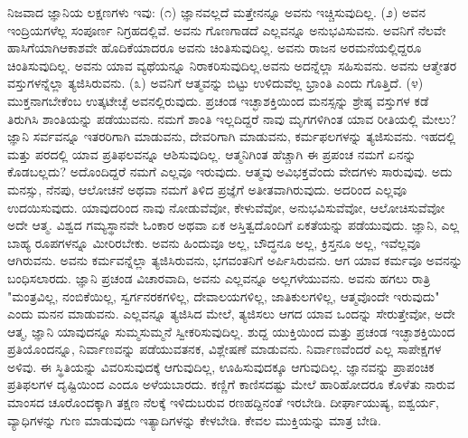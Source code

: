 ನಿಜವಾದ ಜ್ಞಾನಿಯ ಲಕ್ಷಣಗಳು ಇವು: (೧) ಜ್ಞಾನವಲ್ಲದೆ ಮತ್ತೇನನ್ನೂ ಅವನು ಇಚ್ಚಿಸುವುದಿಲ್ಲ. (೨) ಅವನ ಇಂದ್ರಿಯಗಳೆಲ್ಲ ಸಂಪೂರ್ಣ ನಿಗ್ರಹದಲ್ಲಿವೆ. ಅವನು ಗೊಣಗಾಡದೆ ಎಲ್ಲವನ್ನೂ ಅನುಭವಿಸುವನು. ಅವನಿಗೆ ನೆಲವೇ ಹಾಸಿಗೆಯಾಗಿ\break ಆಕಾಶವೇ ಹೊದಿಕೆಯಾದರೂ ಅವನು ಚಿಂತಿಸುವುದಿಲ್ಲ. ಅವನು ರಾಜನ ಅರಮನೆಯಲ್ಲಿದ್ದರೂ ಚಿಂತಿಸುವುದಿಲ್ಲ. ಅವನು ಯಾವ ವ್ಯಥೆಯನ್ನೂ ನಿರಾಕರಿಸುವುದಿಲ್ಲ.\break ಅವನು ಅದನ್ನೆಲ್ಲಾ ಸಹಿಸುವನು. ಅವನು ಆತ್ಮೇತರ ವಸ್ತುಗಳನ್ನೆಲ್ಲಾ ತ್ಯಜಿಸಿರುವನು. (೩) ಅವನಿಗೆ ಆತ್ಮವನ್ನು ಬಿಟ್ಟು ಉಳಿದುವೆಲ್ಲ ಭ್ರಾಂತಿ ಎಂದು ಗೊತ್ತಿದೆ. (೪) ಮುಕ್ತನಾಗಬೇಕೆಂಬ ಉತ್ಕಟೇಚ್ಛೆ ಅವನಲ್ಲಿರುವುದು. ಪ್ರಚಂಡ ಇಚ್ಛಾಶಕ್ತಿಯಿಂದ ಮನಸ್ಸನ್ನು ಶ್ರೇಷ್ಠ ವಸ್ತುಗಳ ಕಡೆ ತಿರುಗಿಸಿ ಶಾಂತಿಯನ್ನು ಪಡೆಯುವನು. ನಮಗೆ ಶಾಂತಿ ಇಲ್ಲದಿದ್ದರೆ ನಾವು ಮೃಗಗಳಿಗಿಂತ ಯಾವ ರೀತಿಯಲ್ಲಿ ಮೇಲು? ಜ್ಞಾನಿ ಸರ್ವವನ್ನೂ ಇತರರಿಗಾಗಿ ಮಾಡುವನು, ದೇವರಿಗಾಗಿ ಮಾಡುವನು, ಕರ್ಮಫಲಗಳನ್ನು ತ್ಯಜಿಸುವನು. ಇಹದಲ್ಲಿ ಮತ್ತು ಪರದಲ್ಲಿ ಯಾವ ಪ್ರತಿಫಲವನ್ನೂ ಆಶಿಸುವುದಿಲ್ಲ. ಆತ್ಮನಿಗಿಂತ ಹೆಚ್ಚಾಗಿ ಈ ಪ್ರಪಂಚ ನಮಗೆ ಏನನ್ನು ಕೊಡಬಲ್ಲದು? ಅದೊಂದಿದ್ದರೆ ನಮಗೆ ಎಲ್ಲವೂ ಇರುವುದು. ಆತ್ಮವು ಅವಿಭಕ್ತವೆಂದು ವೇದಗಳು ಸಾರುವುವು. ಅದು ಮನಸ್ಸು, ನೆನಪು, ಆಲೋಚನೆ ಅಥವಾ ನಮಗೆ ತಿಳಿದ ಪ್ರಜ್ಞೆಗೆ ಅತೀತವಾಗಿರುವುದು. ಅದರಿಂದ ಎಲ್ಲವೂ ಉದಯಿಸುವುದು. ಯಾವುದರಿಂದ ನಾವು ನೋಡುವೆವೋ, ಕೇಳುವೆವೋ, ಅನುಭವಿಸುವೆವೋ, ಆಲೋಚಿಸುವೆವೋ ಅದೇ ಆತ್ಮ. ವಿಶ್ವದ ಗಮ್ಯಸ್ಥಾನವೇ ಓಂಕಾರ ಅಥವಾ ಏಕ ಅಸ್ತಿತ್ವದೊಂದಿಗೆ ಏಕತೆಯನ್ನು ಪಡೆಯುವುದು. ಜ್ಞಾನಿ, ಎಲ್ಲ ಬಾಹ್ಯ ರೂಪಗಳನ್ನೂ ಮೀರಿರಬೇಕು. ಅವನು ಹಿಂದುವೂ ಅಲ್ಲ, ಬೌದ್ಧನೂ ಅಲ್ಲ, ಕ್ರಿಸ್ತನೂ ಅಲ್ಲ, ಇವೆಲ್ಲವೂ ಆಗಿರುವನು. ಅವನು ಕರ್ಮವನ್ನೆಲ್ಲಾ ತ್ಯಜಿಸಿರುವನು, ಭಗವಂತನಿಗೆ ಅರ್ಪಿಸಿರುವನು. ಆಗ ಯಾವ ಕರ್ಮವೂ ಅವನನ್ನು ಬಂಧಿಸಲಾರದು. ಜ್ಞಾನಿ ಪ್ರಚಂಡ ವಿಚಾರವಾದಿ, ಅವನು ಎಲ್ಲವನ್ನೂ ಅಲ್ಲಗಳೆಯುವನು. ಅವನು ಹಗಲು ರಾತ್ರಿ "ಮಂತ್ರವಿಲ್ಲ, ನಂಬಿಕೆಯಿಲ್ಲ, ಸ್ವರ್ಗನರಕಗಳಿಲ್ಲ, ದೇವಾಲಯಗಳಿಲ್ಲ, ಜಾತಿಕುಲಗಳಿಲ್ಲ, ಆತ್ಮವೊಂದೇ ಇರುವುದು" ಎಂದು ಮನನ ಮಾಡುವನು. ಎಲ್ಲವನ್ನೂ ತ್ಯಜಿಸಿದ ಮೇಲೆ, ತ್ಯಜಿಸಲು ಆಗದ ಯಾವ ಒಂದನ್ನು ಸೇರುತ್ತೇವೋ, ಅದೇ ಆತ್ಮ, ಜ್ಞಾನಿ ಯಾವುದನ್ನೂ ಸುಮ್ಮಸುಮ್ಮನೆ ಸ್ವೀಕರಿಸುವುದಿಲ್ಲ. ಶುದ್ದ ಯುಕ್ತಿಯಿಂದ ಮತ್ತು ಪ್ರಚಂಡ ಇಚ್ಛಾಶಕ್ತಿಯಿಂದ ಪ್ರತಿಯೊಂದನ್ನೂ, ನಿರ್ವಾಣವನ್ನು ಪಡೆಯುವತನಕ, ವಿಶ್ಲೇಷಣೆ ಮಾಡುವನು. ನಿರ್ವಾಣವೆಂದರೆ ಎಲ್ಲ ಸಾಪೇಕ್ಷಗಳ ಅಳಿವು. ಈ ಸ್ಥಿತಿಯನ್ನು ವಿವರಿಸುವುದಕ್ಕೆ ಆಗುವುದಿಲ್ಲ, ಊಹಿಸುವುದಕ್ಕೂ ಆಗುವುದಿಲ್ಲ. ಜ್ಞಾನವನ್ನು ಪ್ರಾಪಂಚಿಕ ಪ್ರತಿಫಲಗಳ ದೃಷ್ಟಿಯಿಂದ ಎಂದೂ ಅಳೆಯಬಾರದು. ಕಣ್ಣಿಗೆ ಕಾಣಿಸದಷ್ಟು ಮೇಲೆ ಹಾರಿಹೋದರೂ ಕೊಳೆತು ನಾರುವ ಮಾಂಸದ ಚೂರೊಂದಕ್ಕಾಗಿ ತಕ್ಷಣ ನೆಲಕ್ಕೆ ಇಳಿದುಬರುವ ರಣಹದ್ದಿನಂತೆ ಇರಬೇಡಿ. ದೀರ್ಘಾಯುಷ್ಯ, ಐಶ್ವರ್ಯ, ವ್ಯಾಧಿಗಳನ್ನು ಗುಣ ಮಾಡುವುದು ಇತ್ಯಾದಿಗಳನ್ನು ಕೇಳಬೇಡಿ. ಕೇವಲ ಮುಕ್ತಿಯನ್ನು ಮಾತ್ರ ಬೇಡಿ.

